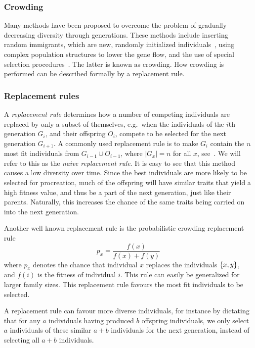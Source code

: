 \subsubsection{Crowding}
Many methods have been proposed to overcome the problem of gradually decreasing diversity through generations. These methods include inserting random immigrants, which are new, randomly initialized individuals~\cite{Cobb93geneticalgorithms}, using complex population structures to lower the gene flow, and the use of special selection procedures~\cite{ursem2002diversity}. The latter is known as crowding.  How crowding is performed can be described formally by a replacement rule.

\subsubsection{Replacement rules}
A \emph{replacement rule} determines how a number of competing individuals are replaced by only a subset of themselves, e.g.\ when the individuals of the $i$th generation $G_i$, and their offspring $O_i$, compete to be selected for the next generation $G_{i+1}$. A commonly used replacement rule is to make $G_i$ contain the $n$ most fit individuals from $G_{i-1} \cup O_{i-1}$, where $\mid G_x\mid = n$ for all $x$, see~\cite{masterThesisGANN}. We will refer to this as the \emph{naive replacement rule}. It is easy to see that this method causes a low diversity over time. Since the best individuals are more likely to be selected for procreation, much of the offspring will have similar traits that yield a high fitness value, and thus be a part of the next generation, just like their parents. Naturally, this increases the chance of the same traits being carried on into the next generation.

Another well known replacement rule is the probabilistic crowding replacement rule~\cite{Mengshoel_and_Goldberg:1999}
%
\[
  p_x = \frac{f(x)}{f(x)+f(y)}
\]
%
where $p_x$ denotes the chance that individual $x$ replaces the individuals $\{ x, y \}$, and $f(i)$ is the fitness of individual $i$. This rule can easily be generalized for larger family sizes. This replacement rule favours the most fit individuals to be selected.

A replacement rule can favour more diverse individuals, for instance by dictating that for any $a$ individuals having produced $b$ offspring individuals, we only select $a$ individuals of these similar $a + b$ individuals for the next generation, instead of selecting all $a + b$ individuals.

